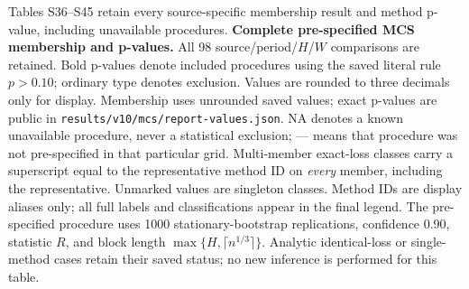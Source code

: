 \documentclass[10pt,a4paper]{article}
\begin{document}
Tables S36--S45 retain every source-specific membership result and method p-value, including unavailable procedures.
\begingroup
\fontsize{7.1}{8.5}\selectfont
\setlength{\tabcolsep}{1.35pt}
\renewcommand{\arraystretch}{1.06}
\setlength{\LTcapwidth}{\linewidth}
\noindent\textbf{Complete pre-specified MCS membership and p-values.}
All 98 source/period/$H$/$W$ comparisons are retained. Bold p-values denote included procedures using the saved literal rule $p>0.10$; ordinary type denotes exclusion. Values are rounded to three decimals only for display. Membership uses unrounded saved values; exact p-values are public in \texttt{results/v10/mcs/report-values.json}. \textsc{NA} denotes a known unavailable procedure, never a statistical exclusion; --- means that procedure was not pre-specified in that particular grid.
Multi-member exact-loss classes carry a superscript equal to the representative method ID on \emph{every} member, including the representative. Unmarked values are singleton classes. Method IDs are display aliases only; all full labels and classifications appear in the final legend.
The pre-specified procedure uses 1000 stationary-bootstrap replications, confidence 0.90, statistic $R$, and block length $\max\{H,\lceil n^{1/3}\rceil\}$. Analytic identical-loss or single-method cases retain their saved status; no new inference is performed for this table.
\end{document}
